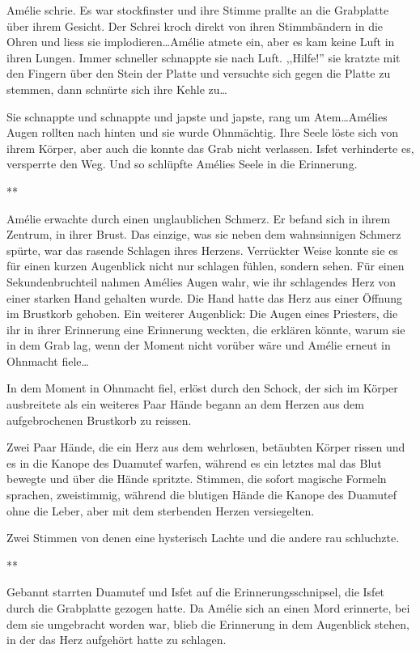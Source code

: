\documentclass[11pt,titlepage,a5paper]{book}
\newcommand{\sterne}{\par{\centering ***\par}}
\begin{document}
Amélie schrie. Es war stockfinster und ihre Stimme prallte an die Grabplatte über ihrem Gesicht. Der Schrei kroch direkt von ihren Stimmbändern in die Ohren und liess sie implodieren\dots Amélie atmete ein, aber es kam keine Luft in ihren Lungen. Immer schneller schnappte sie nach Luft. ,,Hilfe!'' sie kratzte mit den Fingern über den Stein der Platte und versuchte sich gegen die Platte zu stemmen, dann schnürte sich ihre Kehle zu\dots

Sie schnappte und schnappte und japste und japste, rang um Atem\dots Amélies Augen rollten nach hinten und sie wurde Ohnmächtig. Ihre Seele löste sich von ihrem Körper, aber auch die konnte das Grab nicht verlassen. Isfet verhinderte es, versperrte den Weg. Und so schlüpfte Amélies Seele in die Erinnerung.

\sterne

Amélie erwachte durch einen unglaublichen Schmerz. Er befand sich in ihrem Zentrum, in ihrer Brust. Das einzige, was sie neben dem wahnsinnigen Schmerz spürte, war das rasende Schlagen ihres Herzens. Verrückter Weise konnte sie es für einen kurzen Augenblick nicht nur schlagen fühlen, sondern sehen. Für einen Sekundenbruchteil nahmen Amélies Augen wahr, wie ihr schlagendes Herz von einer starken Hand gehalten wurde. Die Hand hatte das Herz aus einer Öffnung im Brustkorb gehoben. Ein weiterer Augenblick: Die Augen eines Priesters, die ihr in ihrer Erinnerung eine Erinnerung weckten, die erklären könnte, warum sie in dem Grab lag, wenn der Moment nicht vorüber wäre und Amélie erneut in Ohnmacht fiele\dots

In dem Moment in Ohnmacht fiel, erlöst durch den Schock, der sich im Körper ausbreitete als ein weiteres Paar Hände begann an dem Herzen aus dem aufgebrochenen Brustkorb zu reissen.

Zwei Paar Hände, die ein Herz aus dem wehrlosen, betäubten Körper rissen und es in die Kanope des Duamutef warfen, während es ein letztes mal das Blut bewegte und über die Hände spritzte. Stimmen, die sofort magische Formeln sprachen, zweistimmig, während die blutigen Hände die Kanope des Duamutef ohne die Leber, aber mit dem sterbenden Herzen versiegelten. 

Zwei Stimmen von denen eine hysterisch Lachte und die andere rau schluchzte.

\sterne

Gebannt starrten Duamutef und Isfet auf die Erinnerungsschnipsel, die Isfet durch die Grabplatte gezogen hatte. Da Amélie sich an einen Mord erinnerte, bei dem sie umgebracht worden war, blieb die Erinnerung in dem Augenblick stehen, in der das Herz aufgehört hatte zu schlagen. 
\end{document}
